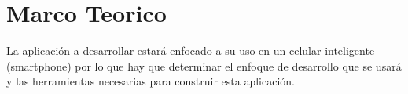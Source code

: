 \chapter{Marco Teorico} %
\label{cha:marco_teorico}

La aplicación a desarrollar estará enfocado a su uso en un celular inteligente (smartphone) por lo que hay que determinar el enfoque de desarrollo que se usará y las herramientas necesarias para construir esta aplicación.



















